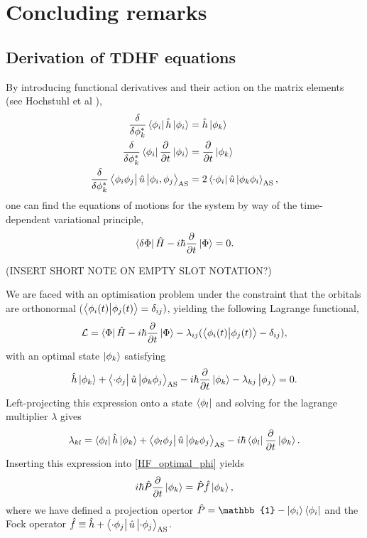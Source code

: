 \documentclass[aip,jcp,reprint,floatfix]{revtex4-1}
\begin{document}
\section{Concluding remarks}
\begin{appendices}
\section{Derivation of TDHF equations} \label{TDHF_Derivation}
By introducing functional derivatives and their action on the matrix elements (see Hochstuhl et al \cite{Hochstuhl2014}),
\begin{align}
    \frac{\delta}{\delta \phi^*_k}\bra{\phi_i}\hat{h}\ket{\phi_i} &= \hat{h}\ket{\phi_k} \\
    \frac{\delta}{\delta \phi^*_k}\bra{\phi_i}\frac{\partial}{\partial t} \ket{\phi_i} 
    &= \frac{\partial}{\partial t}\ket{\phi_k} \\
    \frac{\delta}{\delta \phi^*_k}\bra{\phi_i \phi_j} \hat{u} \ket{\phi_i, \phi_j}_{\text{AS}}
    &= 2\bra{\cdot \phi_i} \hat{u} \ket{\phi_k \phi_i}_{\text{AS}},
\end{align}
one can find the equations of motions for the system by way of the time-dependent variational principle,
\begin{equation}
    \label{td_variational_principle}
    \bra{\delta \Phi} \hat{H} - i\hbar \frac{\partial}{\partial t} \ket{\Phi} = 0.
\end{equation}

(INSERT SHORT NOTE ON EMPTY SLOT NOTATION?)

We are faced with an optimisation problem under the constraint that the orbitals are orthonormal ($\braket{\phi_i(t)}{\phi_j(t)} = \delta_{ij})$, yielding the following Lagrange functional,
\begin{equation}
    \mathcal{L} = \bra{\Phi} \hat{H} - i\hbar \frac{\partial}{\partial t} \ket{\Phi} 
    - \lambda_{ij}(\braket{\phi_i(t)}{\phi_j(t)} - \delta_{ij}),
\end{equation}
with an optimal state $\ket{\phi_k}$ satisfying
\begin{equation}
    \label{HF_optimal_phi}
    \hat{h}\ket{\phi_k} + \bra{\cdot \phi_j} \hat{u} \ket{\phi_k \phi_j}_{\text{AS}} 
    - i\hbar\frac{\partial}{\partial t} \ket{\phi_k} - \lambda_{kj} \ket{\phi_j} = 0.
\end{equation}
Left-projecting this expression onto a state $\bra{\phi_l}$ and solving for the lagrange multiplier $\lambda$ gives
\begin{equation}
    \lambda_{kl} = \bra{\phi_l} \hat{h} \ket{\phi_k} 
    + \bra{\phi_l \phi_j} \hat{u} \ket{\phi_k \phi_j}_{\text{AS}}
    - i\hbar \bra{\phi_l} \frac{\partial}{\partial t} \ket{\phi_k}.
\end{equation}
Inserting this expression into \autoref{HF_optimal_phi} yields
\begin{equation}
    i\hbar \hat{P}\frac{\partial}{\partial t} \ket{\phi_k} = \hat{P} \hat{f} \ket{\phi_k},
\end{equation}
where we have defined a projection opertor $\hat{P} = \mathbb{1} - \ket{\phi_i}\bra{\phi_i}$ and the Fock operator $\hat{f} \equiv \hat{h} + \bra{\cdot \phi_j} \hat{u} \ket{\cdot \phi_j}_{\text{AS}}$.


\end{appendices}
\end{document}
